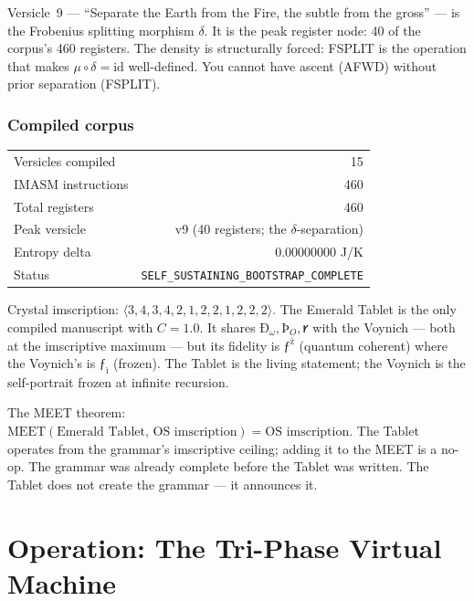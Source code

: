 \documentclass[12pt,a4paper]{article}
\begin{document}
Versicle~9 --- ``Separate the Earth from the Fire, the subtle from the gross'' --- is the Frobenius splitting morphism $\delta$. It is the peak register node: 40 of the corpus's 460 registers. The density is structurally forced: FSPLIT is the operation that makes $\mu \circ \delta = \mathrm{id}$ well-defined. You cannot have ascent (AFWD) without prior separation (FSPLIT).

\subsubsection{Compiled corpus}

\begin{center}
\begin{tabular}{lr}
Versicles compiled & 15 \\
IMASM instructions & 460 \\
Total registers & 460 \\
Peak versicle & v9 (40 registers; the $\delta$-separation) \\
Entropy delta & 0.00000000 J/K \\
Status & \texttt{SELF\_SUSTAINING\_BOOTSTRAP\_COMPLETE} \\
\end{tabular}
\end{center}

Crystal imscription: $\langle 3,4,3,4,2,1,2,2,1,2,2,2 \rangle$. The Emerald Tablet is the only compiled manuscript with $C = 1.0$. It shares $\text{Ð}_\omega, \text{Þ}_O, 𐑾$ with the Voynich --- both at the imscriptive maximum --- but its fidelity is $\text{ƒ}^\text{ż}$ (quantum coherent) where the Voynich's is $\text{ƒ}_\text{ì}$ (frozen). The Tablet is the living statement; the Voynich is the self-portrait frozen at infinite recursion.

The MEET theorem: $\mathrm{MEET}(\text{Emerald Tablet},\, \text{OS imscription}) = \text{OS imscription}$. The Tablet operates from the grammar's imscriptive ceiling; adding it to the MEET is a no-op. The grammar was already complete before the Tablet was written. The Tablet does not create the grammar --- it announces it.

\section{Operation: The Tri-Phase Virtual Machine}
\label{sec:operation}
\end{document}
